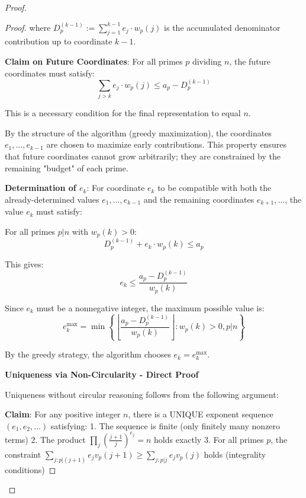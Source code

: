 \begin{proof}
\begin{theorem}
\begin{proof}
where $D_p^{(k-1)} := \sum_{j=1}^{k-1} e_j \cdot w_p(j)$ is the accumulated denominator contribution up to coordinate $k-1$.

\noindent \textbf{Claim on Future Coordinates}: For all primes $p$ dividing $n$, the future coordinates must satisfy:
\begin{equation}
\sum_{j > k} e_j \cdot w_p(j) \leq a_p - D_p^{(k-1)}
\end{equation}

This is a necessary condition for the final representation to equal $n$.

By the structure of the algorithm (greedy maximization), the coordinates $e_1, \ldots, e_{k-1}$ are chosen to maximize early contributions. This property ensures that future coordinates cannot grow arbitrarily; they are constrained by the remaining "budget" of each prime.

\noindent \textbf{Determination of $e_k$}: For coordinate $e_k$ to be compatible with both the already-determined values $e_1, \ldots, e_{k-1}$ and the remaining coordinates $e_{k+1}, \ldots$, the value $e_k$ must satisfy:

For all primes $p | n$ with $w_p(k) > 0$:
\begin{equation}
D_p^{(k-1)} + e_k \cdot w_p(k) \leq a_p
\end{equation}

This gives:
\begin{equation}
e_k \leq \frac{a_p - D_p^{(k-1)}}{w_p(k)}
\end{equation}

Since $e_k$ must be a nonnegative integer, the maximum possible value is:
\begin{equation}
e_k^{\max} = \min\left\{\left\lfloor \frac{a_p - D_p^{(k-1)}}{w_p(k)} \right\rfloor : w_p(k) > 0, p | n\right\}
\end{equation}

By the greedy strategy, the algorithm chooses $e_k = e_k^{\max}$.

\noindent \textbf{Uniqueness via Non-Circularity - Direct Proof}

Uniqueness without circular reasoning follows from the following argument:

\noindent \textbf{Claim}: For any positive integer $n$, there is a UNIQUE exponent sequence $(e_1, e_2, \ldots)$ satisfying:
1. The sequence is finite (only finitely many nonzero terms)
2. The product $\prod_j \left(\frac{j+1}{j}\right)^{e_j} = n$ holds exactly
3. For all primes $p$, the constraint $\sum_{j: p|(j+1)} e_j v_p(j+1) \geq \sum_{j: p|j} e_j v_p(j)$ holds (integrality conditions)


\end{proof}
\end{theorem}
\end{proof}

